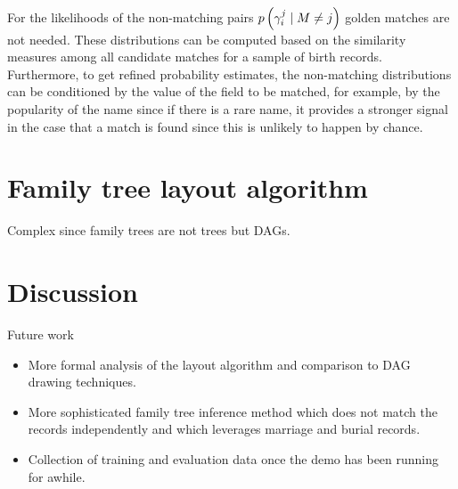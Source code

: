 \documentclass[sigconf]{acmart}
\begin{document}
For the likelihoods of the non-matching pairs $p\left(\gamma^{j}_{i} \mid M\neq j\right)$ 
golden matches are not needed. These distributions can be computed based on the 
similarity measures among all candidate matches for a sample of birth records. 
Furthermore, to get refined probability estimates, the non-matching 
distributions can be conditioned by the value of the field to be matched, for 
example, by the popularity of the name since if there is a rare name, it 
provides a stronger signal in the case that a match is found since this is 
unlikely to happen by chance.

\section{Family tree layout algorithm}

Complex since family trees are not trees but DAGs.

\section{Discussion}

Future work
\begin{itemize}
 \item More formal analysis of the layout algorithm and comparison to DAG 
 drawing techniques.
 \item More sophisticated family tree inference method which does not match the 
 records independently and which leverages marriage and burial records.
 \item Collection of training and evaluation data once the demo has been 
 running for awhile.
\end{itemize}


 
\end{document}
